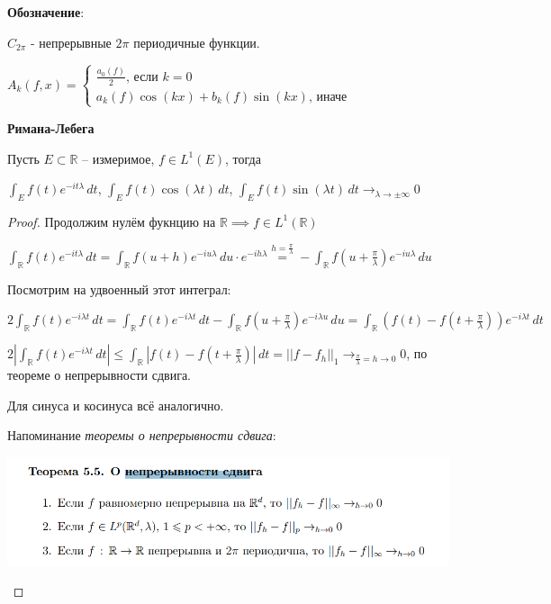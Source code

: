 \begin{remark}
    \textbf{Обозначение}:

    $C_{2\pi}$ - непрерывные $2\pi$ периодичные функции.

    $A_k (f, x) = \begin{cases}
        \frac{a_0(f)}{2} \text{, если $k = 0$} \\
        a_k (f) \cos (kx) + b_k (f) \sin (kx) \text{, иначе}
    \end{cases}$
\end{remark}


\begin{lemma}
    \textbf{Римана-Лебега}

    Пусть $E \subset \mathbb{R}$ -- измеримое, $f \in L^1 (E)$, тогда
    
    $\int_E f(t) e^{-i t \lambda} \, dt$, $\int_E f(t) \cos (\lambda t) \, dt$, $\int_E f(t) \sin (\lambda t) \, dt \rightarrow_{\lambda \to \pm \infty} 0$
\end{lemma}

\begin{proof}
    Продолжим нулём фукнцию на $\mathbb{R} \implies f \in L^1 (\mathbb{R})$

    $\int_{\mathbb{R}} f(t) e^{-i t \lambda} \, dt = \int_{\mathbb{R}} f(u + h) e^{-iu\lambda} \, du \cdot  e^{-ih\lambda} \overset{h = \frac{\pi}{\lambda}}{=} - \int_{\mathbb{R}} f(u + \frac{\pi}{\lambda}) e^{-iu\lambda} \, du$

    Посмотрим на удвоенный этот интеграл:
    
    $2 \int_{\mathbb{R}} f(t) e^{-i \lambda t} \, dt = \int_{\mathbb{R}} f(t) e^{-i \lambda t} \, dt - \int_{\mathbb{R}} f(u + \frac{\pi}{\lambda}) e^{-i\lambda u} \, du = \int_{\mathbb{R}} (f(t) - f(t + \frac{\pi}{\lambda})) e^{-i \lambda t} \, dt $

    $2 \left | \int_{\mathbb{R}} f(t) e^{-i \lambda t} \, dt \right | \leqslant \int_{\mathbb{R}} \left | f(t) - f(t + \frac{\pi}{\lambda}) \right | \, dt = || f - f_h ||_1 \rightarrow_{\frac{\pi}{\lambda} = h \to 0} 0$, по теореме о непрерывности сдвига.

    Для синуса и косинуса всё аналогично.


    Напоминание \textit{теоремы о непрерывности сдвига}:

    \begin{center}
        \includegraphics[width=13cm]{assets/05-fourierreihe/shift-continuous.png}
    \end{center}
\end{proof}

